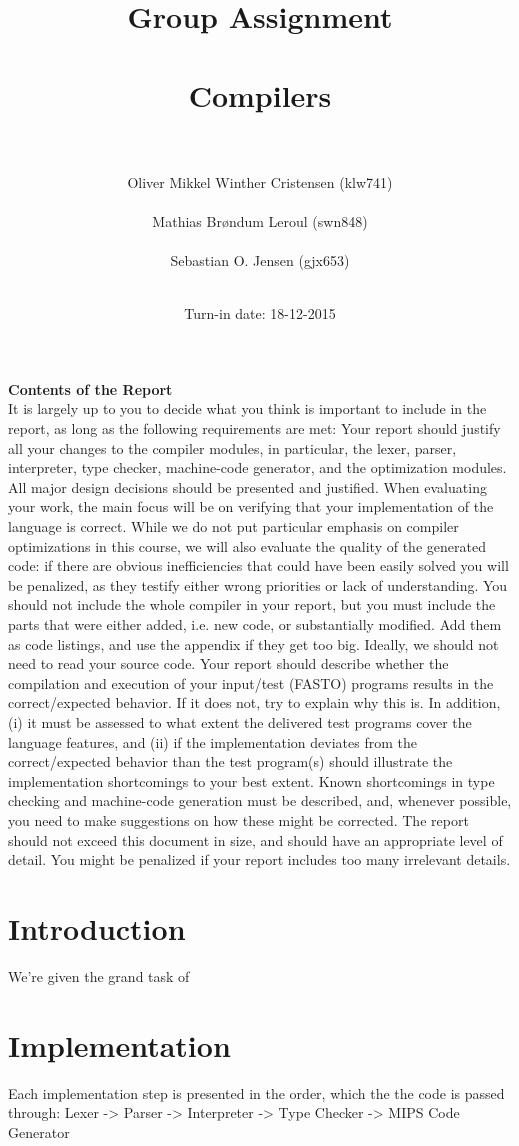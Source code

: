 \documentclass[]{article}
\title{Group Assignment\\ \ \\Compilers\\ \ \\}
\author{Oliver Mikkel Winther Cristensen (klw741) \\ \ \\Mathias Brøndum Leroul (swn848)\\ \ \\Sebastian O. Jensen (gjx653)\\ \ \\}
\date{Turn-in date: 18-12-2015}
\begin{document}
\maketitle
\newpage

\textbf{Contents of the Report}\\
It is largely up to you to decide what you think is important to include in the report, as long as
the following requirements are met:
Your report should justify all your changes to the compiler modules, in particular, the lexer,
parser, interpreter, type checker, machine-code generator, and the optimization modules. All
major design decisions should be presented and justified.
When evaluating your work, the main focus will be on verifying that your implementation
of the language is correct. While we do not put particular emphasis on compiler optimizations
in this course, we will also evaluate the quality of the generated code: if there are obvious
inefficiencies that could have been easily solved you will be penalized, as they testify either
wrong priorities or lack of understanding.
You should not include the whole compiler in your report, but you must include the parts
that were either added, i.e. new code, or substantially modified. Add them as code listings, and
use the appendix if they get too big. Ideally, we should not need to read your source code.
Your report should describe whether the compilation and execution of your input/test (FASTO)
programs results in the correct/expected behavior. If it does not, try to explain why this is. In
addition, (i) it must be assessed to what extent the delivered test programs cover the language
features, and (ii) if the implementation deviates from the correct/expected behavior than the test
program(s) should illustrate the implementation shortcomings to your best extent.
Known shortcomings in type checking and machine-code generation must be described, and,
whenever possible, you need to make suggestions on how these might be corrected.
The report should not exceed this document in size, and should have an appropriate level of
detail. You might be penalized if your report includes too many irrelevant details.

\section{Introduction}
	We're given the grand task of 
\section{Implementation}
	Each implementation step is presented in the order, which the the code is passed through: Lexer -> Parser -> Interpreter -> Type Checker -> MIPS Code Generator
	
\end{document}
